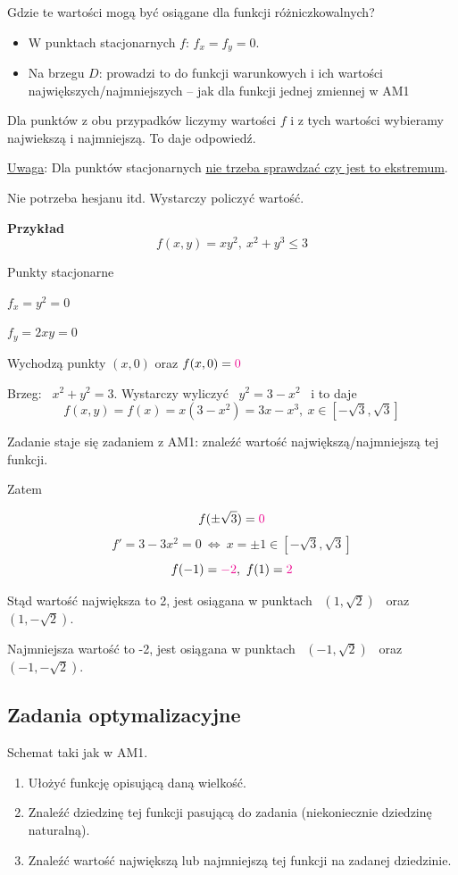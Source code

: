Gdzie te wartości mogą być osiągane dla funkcji różniczkowalnych?
\begin{itemize}
    \item W punktach stacjonarnych $f$: $ f_x = f_y = 0 $.
    \item Na brzegu $D$: prowadzi to do funkcji warunkowych i ich wartości największych/najmniejszych -- jak dla funkcji jednej zmiennej w AM1
\end{itemize}
\bigskip

Dla punktów z obu przypadków liczymy wartości $f$ i z tych wartości wybieramy najwiekszą i najmniejszą. To daje odpowiedź.

\underline{Uwaga}: Dla punktów stacjonarnych \underline{nie trzeba sprawdzać czy jest to ekstremum}.

Nie potrzeba hesjanu itd. Wystarczy policzyć wartość.
\bigskip

\textbf{Przykład}
\[ f(x,y) = xy^2, \ x^2 + y^3 \leq 3 \]

Punkty stacjonarne

$ f_x = y^2 = 0 $

$ f_y = 2xy = 0 $

Wychodzą punkty $ (x, 0) $ oraz $ f(x,0) = \textcolor{magenta}{0} $

Brzeg: \ $ x^2 + y^2 = 3 $. Wystarczy wyliczyć \ $ y^2 = 3 - x^2 $ \ i to daje
\[f(x,y) = f(x) = x(3-x^2) = 3x - x^3, \ x\in \left[-\sqrt3, \sqrt3 \right] \]

Zadanie staje się zadaniem z AM1: znaleźć wartość największą/najmniejszą tej funkcji.

Zatem

\[ f(\pm \sqrt3) = \textcolor{magenta}{0} \]
\[ f' = 3 - 3x^2 = 0 \ \Leftrightarrow \ x = \pm 1 \in \left[ -\sqrt3, \sqrt3 \right] \]
\[ f(-1) = \textcolor{magenta}{-2}, \ f(1) = \textcolor{magenta}{2} \]

Stąd wartość największa to 2, jest osiągana w punktach \ $(1, \sqrt2) $ \ oraz \ $ (1, -\sqrt2) $.

Najmniejsza wartość to -2, jest osiągana w punktach \ $(-1, \sqrt2) $ \ oraz \ $(-1, -\sqrt2) $.


\subsection*{Zadania optymalizacyjne}

Schemat taki jak w AM1.
\begin{enumerate}
    \item Ułożyć funkcję opisującą daną wielkość.
    \item Znaleźć dziedzinę tej funkcji pasującą do zadania (niekoniecznie dziedzinę naturalną).
    \item Znaleźć wartość największą lub najmniejszą tej funkcji na zadanej dziedzinie.
\end{enumerate}
\bigskip

